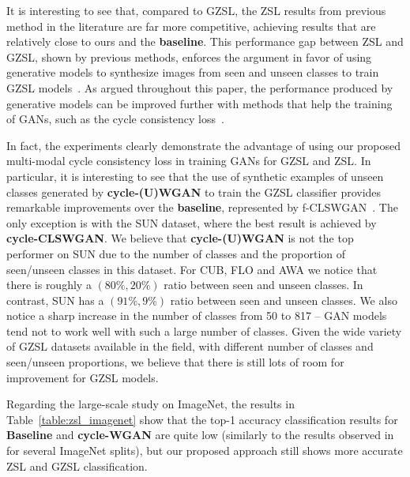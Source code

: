 \documentclass[runningheads]{llncs}
\begin{document}
It is interesting to see that, compared to GZSL, the ZSL results from previous method in the literature are far more competitive, achieving results that are relatively close to ours and the \textbf{baseline}.  
This performance gap between ZSL and GZSL, shown by previous methods, enforces the argument in favor of using generative models to synthesize images from seen and unseen classes to train GZSL models~\cite{XianCVPR2018,bucher2017generating,long2017zero}. As argued throughout this paper, the performance produced by generative models can be improved further with methods that help the training of GANs, such as the cycle consistency loss~\cite{CycleGAN2017}. 

In fact, the experiments clearly demonstrate the advantage of using our proposed multi-modal cycle consistency loss in training GANs for GZSL and ZSL.  In particular, it is interesting to see that the use of synthetic examples of unseen classes generated by \textbf{cycle-(U)WGAN} to train the GZSL classifier provides remarkable improvements over the \textbf{baseline}, represented by f-CLSWGAN~\cite{XianCVPR2018}.  The only exception is with the SUN dataset, where the best result is achieved by \textbf{cycle-CLSWGAN}.  We believe that \textbf{cycle-(U)WGAN} is not the top performer on SUN due to the number of classes and the proportion of seen/unseen classes in this dataset. For CUB, FLO and AWA we notice that there is roughly a $(80\%,20\%)$ ratio between seen and unseen classes.  In contrast, SUN has a $(91\%,9\%)$ ratio between seen and unseen classes. We also notice a sharp increase in the number of classes from 50 to 817 -- GAN models tend not to work well with such a large number of classes. 
Given the wide variety of GZSL datasets available in the field, with different number of classes and seen/unseen proportions, we believe that there is still lots of room for improvement for GZSL models.

Regarding the large-scale study on ImageNet, the results in Table~\ref{table:zsl_imagenet} show that the top-1 accuracy classification
results for \textbf{Baseline} and \textbf{cycle-WGAN} are quite low (similarly to the results observed in~\cite{XianCVPR2018} for several ImageNet splits),
but our proposed approach still shows more accurate ZSL and GZSL classification.
\end{document}
